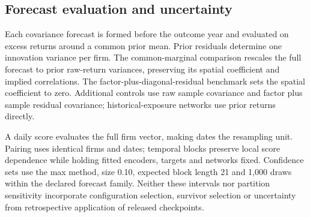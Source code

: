 \documentclass[11pt]{article}
\begin{document}
\subsection{Forecast evaluation and uncertainty}
Each covariance forecast is formed before the outcome year and evaluated on
excess returns around a common prior mean. Prior residuals determine one
innovation variance per firm. The common-marginal comparison rescales the full
forecast to prior raw-return variances, preserving its spatial coefficient and
implied correlations. The factor-plus-diagonal-residual benchmark sets the
spatial coefficient to zero. Additional controls use raw sample covariance and
factor plus sample residual covariance; historical-exposure networks use prior
returns directly.

\begin{table}[htbp]
  \centering\footnotesize\setlength{\tabcolsep}{4pt}
  
  \caption{Paired calibration and direct-benchmark contrasts.
    Calibration compares
    each pretrained model's calibrated and native procedures; direct compares
    its calibrated forecast with native direct distance. Entries report summed
    joint log-score differences and conditional 95\% intervals using stationary
    bootstrap expected blocks of 21 and 63 trading days, with 9,999 draws.
  All networks match effective neighbor counts.}
\end{table}
\begin{table}[htbp]
  \centering\small
  
  \caption{Direct covariance controls on common evaluation outcomes. Gains are
  relative to the joint characteristic reference within each specification.}
\end{table}
\begin{table}[htbp]
  \centering\small
  
  \caption{Forecasts retained by the principal model confidence set at 10\%
  test size, using common evaluation dates.}\label{tab:confidence-set}
\end{table}

A daily score evaluates the full firm vector, making dates the resampling unit.
Pairing uses identical firms and dates; temporal blocks preserve local score
dependence while holding fitted encoders, targets and networks fixed. Confidence
sets use the max method, size 0.10, expected block length 21 and 1,000 draws
within the declared forecast family. Neither these intervals nor partition
sensitivity incorporate configuration selection, survivor selection or
uncertainty from retrospective application of released checkpoints.
\end{document}

